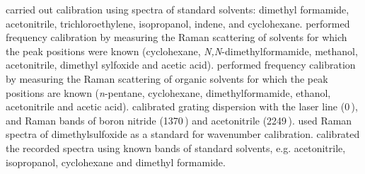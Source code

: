 \textcite{Jayanth2011} carried out calibration using spectra of standard
solvents: dimethyl formamide, acetonitrile, trichloroethylene, isopropanol,
indene, and cyclohexane. \textcite{Oladepo2011} performed frequency calibration
by measuring the Raman scattering of solvents for which the peak positions were
known (cyclohexane, \textit{N,N}-dimethylformamide, methanol, acetonitrile,
dimethyl sylfoxide and acetic acid). \textcite{Billinghurst2012} performed
frequency calibration by measuring the Raman scattering of organic solvents for
which the peak positions are known (\textit{n}-pentane, cyclohexane,
dimethylformamide, ethanol, acetonitrile and acetic acid).
\textcite{Kumamoto2012} calibrated grating dispersion with the laser line
(0\,\icm), and Raman bands of boron nitride (1370\,\icm) and acetonitrile
(2249\,\icm). \textcite{Srivastava2008,Muntean2013} used Raman spectra of
dimethylsulfoxide as a standard for wavenumber calibration.
\textcite{Mondal2016} calibrated the recorded spectra using known bands of
standard solvents, e.g. acetonitrile, isopropanol, cyclohexane and dimethyl
formamide.
